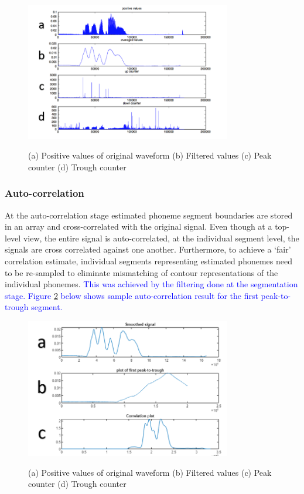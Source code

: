 \begin{figure}
\centering
  \includegraphics[width=9cm]{thesis/images/corr00}\\
  \caption{(a) Positive values of original waveform (b) Filtered values (c) Peak counter (d) Trough counter}\label{fig_c3_exp02}
\end{figure}
\subsubsection{Auto-correlation}
At the auto-correlation stage estimated phoneme segment boundaries are stored in an array and cross-correlated with the original signal.  Even though at a top-level view, the entire signal is auto-correlated, at the individual segment level, the signals are cross correlated against one another.  Furthermore, to achieve a ‘fair’ correlation estimate, individual segments representing estimated phonemes need to be re-sampled to eliminate mismatching of contour representations of the individual phonemes.\textcolor{blue}{  This was achieved by the filtering done at the segmentation stage.  Figure \ref{fig_c3_exp03} below shows sample auto-correlation result for the first peak-to-trough segment.}
\begin{figure}
\centering
  \includegraphics[width=9cm]{thesis/images/corr01}\\
  \caption{(a) Positive values of original waveform (b) Filtered values (c) Peak counter (d) Trough counter}\label{fig_c3_exp03}
\end{figure}

